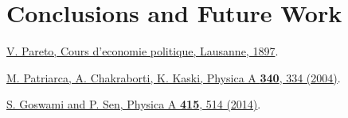 \documentclass[12pt]{article} %
\begin{document}
\section{Conclusions and Future Work}


\begin{thebibliography}{2} %
\href{{http://www.institutcoppet.org/2012/05/08/cours-deconomie-politique-1896-de-vilfredo-pareto}}{V. Pareto, Cours d'economie politique, Lausanne, 1897}.

\href{{http://www.sciencedirect.com/science/article/pii/S0378437104004327}}{M. Patriarca, A. Chakraborti, K. Kaski, Physica A \textbf{340}, 334 (2004)}.

\href{{http://www.sciencedirect.com/science/article/pii/S0378437114006967}}{S. Goswami and P. Sen, Physica A \textbf{415}, 514 (2014)}.
\end{thebibliography}
\end{document}
